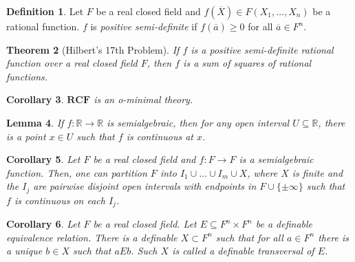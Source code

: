 \documentclass{amsart}
\newtheorem{theorem}{Theorem}[subsection]
\newtheorem{lemma}[theorem]{Lemma}
\newtheorem{corollary}[theorem]{Corollary}
\theoremstyle{definition}
\newtheorem{definition}[theorem]{Definition}
\numberwithin{equation}{section}
\begin{document}
\begin{definition}
  Let $F$ be a real closed field and
  $f(\overline{X}) \in F(X_1,\dots,X_n)$ be a rational function.
  $f$ is \emph{positive semi-definite} if $f(\overline{a}) \ge 0$ for all $\overline{a} \in F^n$.
\end{definition}

\begin{theorem}[Hilbert's 17th Problem]
  If $f$ is a positive semi-definite rational function over a real closed field $F$,
  then $f$ is a sum of squares of rational functions.
\end{theorem}

\begin{corollary}
  $\mathbf{RCF}$ is an o-minimal theory.
\end{corollary}

\begin{lemma}
  If $f:\mathbb{R} \to \mathbb{R}$ is semialgebraic,
  then for any open interval $U \subseteq \mathbb{R}$,
  there is a point $x\in U$ such that $f$ is continuous at $x$.
\end{lemma}

\begin{corollary}
  Let $F$ be a real closed field and $f: F \to F$ is a semialgebraic function.
  Then, one can partition $F$ into $I_1\cup \dots \cup I_m\cup X$,
  where $X$ is finite and the $I_j$ are pairwise disjoint open intervals with endpoints in $F\cup \{\pm\infty\}$
  such that $f$ is continuous on each $I_j$.
\end{corollary}


\begin{corollary}
  Let $F$ be a real closed field.
  Let $E \subseteq F^n \times F^n$ be a definable equivalence relation.
  There is a definable $X \subset F^n$ such that for all
  $a \in F^n$ there is a unique $b\in X$ such that $aEb$.
  Such $X$ is called a definable \emph{transversal} of $E$.
\end{corollary}
\end{document}
